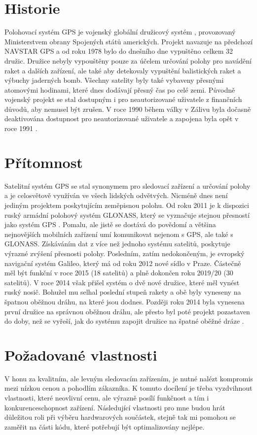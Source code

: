 \documentclass[FM,BP]{tulthesis}  %
\begin{document}
\section{Historie}
Polohovací systém GPS je vojenský globální družicový systém \cite{what}, provozovaný Ministerstvem obrany Spojených států amerických. Projekt navazuje na předchozí NAVSTAR GPS a od roku 1978 bylo do dnešního dne vypuštěno celkem 32 družic. Družice nebyly vypouštěny pouze za účelem určování polohy pro navádění raket a dalších zařízení, ale také aby detekovaly vypuštění balistických raket a výbuchy jaderných bomb. Všechny satelity byly také vybaveny přesnými atomovými hodinami, které dnes dodávají přesný čas po celé zemi. Původně vojenský projekt se stal dostupným i pro neautorizované uživatele z finančních důvodů, aby nemusel být zrušen. V roce 1990 během války v Zálivu byla dočasně deaktivována dostupnost pro neautorizované uživatele a zapojena byla opět v roce 1991  \cite{guide}.

\section{Přítomnost}
Satelitní systém GPS se stal synonymem pro sledovací zařízení a určování polohy a je celosvětově využíván ve všech lidských odvětvých. Nicméně dnes není jediným projektem poskytujícím zeměpisnou polohu. Od roku 2011 je k dispozici ruský armádní polohový systém GLONASS, který se vyznačuje stejnou přesností jako systém GPS \cite{glonass}. Pomalu, ale jistě se dostává do povědomí a většina nejnovějších mobilních zařízení umí komunikovat nejenom s GPS, ale také s GLONASS. Získáváním dat z více než jednoho systému satelitů, poskytuje výrazné zvýšení přesnosti polohy. Posledním, zatím nedokončeným, je evropský navigační systém Galileo, který má od roku 2012 nové sídlo v Praze. Částečně měl být funkční v roce 2015 (18 satelitů) a plně dokončen roku 2019/20 (30 satelitů). V roce 2014 však přišel systém o dvě nové družice, které měl vynést ruský nosič. Bohužel mu selhal poslední stupeň rakety a obě byly vyneseny na špatnou oběžnou dráhu, na které jsou dodnes. Později roku 2014 byla vynesena první družice na správnou oběžnou dráhu, ale přesto byl poté projekt pozastaven do doby, než se vyřeší, jak do systému zapojit družice na špatné oběžné dráze \cite{gps}.


\section{Požadované vlastnosti}
V honu za kvalitním, ale levným sledovacím zařízením, je nutné nalézt kompromis mezi nízkou cenou a pohodlím zákazníka. K tomuto docílení je třeba vyzdvihnout vlastnosti, které neovlivní cenu, ale výrazně posílí funkčnost a tím i konkurenceschopnost zařízení. Následující vlastnosti pro mne budou hrát důležitou roli při výběru hardwarových součástek, stejně tak mi pomohou se zaměřit na části kódu, které potřebují být optimalizovány nejlépe.
\end{document}
